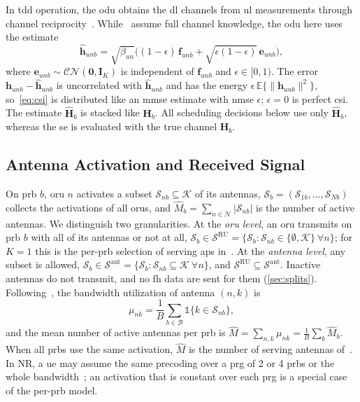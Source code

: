 \documentclass[10pt, final, journal, letterpaper, twocolumn]{IEEEtran}
\newcommand{\Nset}{\mathcal{N}}
\newcommand{\Kset}{\mathcal{K}}
\newcommand{\Bset}{\mathcal{B}}
\newcommand{\Sru}{\mathcal{S}^{\mathrm{RU}}}
\newcommand{\Sant}{\mathcal{S}^{\mathrm{ant}}}
\newcommand{\CN}{\mathcal{CN}}
\newcommand{\E}{\mathbb{E}}
\newcommand{\bh}{\mathbf{h}}
\newcommand{\bhh}{\hat{\mathbf{h}}}
\newcommand{\bH}{\mathbf{H}}
\newcommand{\bHh}{\hat{\mathbf{H}}}
\newcommand{\ind}{\mathbb{1}}
\begin{document}
In \gls{tdd} operation, the \gls{odu} obtains the \gls{dl} channels from \gls{ul} measurements through channel reciprocity~\cite{girycki2024twc}. While~\cite{girycki2024eucnc,girycki2024twc} assume full channel knowledge, the \gls{odu} here uses the estimate
\begin{equation}
  \bhh_{unb} = \sqrt{\beta_{un}} \Big( (1 - \epsilon)\, \mathbf{f}_{unb} + \sqrt{\epsilon (1 - \epsilon)}\, \mathbf{e}_{unb} \Big),
  \label{eq:csi}
\end{equation}
where $\mathbf{e}_{unb} \sim \CN(\mathbf{0}, \mathbf{I}_K)$ is independent of $\mathbf{f}_{unb}$ and $\epsilon \in [0, 1)$. The error $\bh_{unb} - \bhh_{unb}$ is uncorrelated with $\bhh_{unb}$ and has the energy $\epsilon\, \E\{\|\bh_{unb}\|^2\}$, so~\eqref{eq:csi} is distributed like an \gls{mmse} estimate with \gls{nmse} $\epsilon$; $\epsilon = 0$ is perfect \gls{csi}. The estimate $\bHh_b$ is stacked like $\bH_b$. All scheduling decisions below use only $\bHh_b$, whereas the \gls{se} is evaluated with the true channel $\bH_b$.

\subsection{Antenna Activation and Received Signal}\label{sec:activation}

On \gls{prb} $b$, \gls{oru} $n$ activates a subset $\mathcal{S}_{nb} \subseteq \Kset$ of its antennas, $\mathcal{S}_b = (\mathcal{S}_{1b}, \dots, \mathcal{S}_{Nb})$ collects the activations of all \glspl{oru}, and $\hat{M}_b = \sum_{n \in \Nset} |\mathcal{S}_{nb}|$ is the number of active antennas. We distinguish two granularities. At the \emph{\gls{oru} level}, an \gls{oru} transmits on \gls{prb} $b$ with all of its antennas or not at all, $\mathcal{S}_b \in \Sru = \{\mathcal{S}_b : \mathcal{S}_{nb} \in \{\emptyset, \Kset\}\ \forall n\}$; for $K = 1$ this is the per-\gls{prb} selection of serving \glspl{ap} in~\cite{girycki2024twc}. At the \emph{antenna level}, any subset is allowed, $\mathcal{S}_b \in \Sant = \{\mathcal{S}_b : \mathcal{S}_{nb} \subseteq \Kset\ \forall n\}$, and $\Sru \subseteq \Sant$. Inactive antennas do not transmit, and no \gls{fh} data are sent for them (\cref{sec:splits}). Following~\cite[eq.~(14)]{girycki2024eucnc}, the bandwidth utilization of antenna $(n,k)$ is
\begin{equation}
  \mu_{nk} = \frac{1}{B} \sum_{b \in \Bset} \ind\{k \in \mathcal{S}_{nb}\},
  \label{eq:mu}
\end{equation}
and the mean number of active antennas per \gls{prb} is $\hat{M} = \sum_{n, k} \mu_{nk} = \frac{1}{B} \sum_{b} \hat{M}_b$. When all \glspl{prb} use the same activation, $\hat{M}$ is the number of serving antennas of~\cite{girycki2024eucnc}. In NR, a \gls{ue} may assume the same precoding over a \gls{prg} of 2 or 4 \glspl{prb} or the whole bandwidth~\cite[Sec.~5.1.2.3]{ts38214}; an activation that is constant over each \gls{prg} is a special case of the per-\gls{prb} model.
\end{document}
